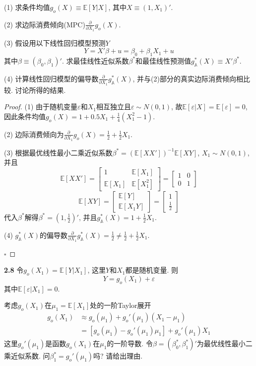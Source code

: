 \documentclass[cn,12pt,math=mtpro2,citestyle=gb7714-2015,bibstyle=gb7714-2015,twocol,mode=simple]{elegantbook}
\newcommand{\E}{\mathbb{E}}
\begin{document}
(1) 求条件均值$g_o(X)\equiv \E[Y|X]$, 其中$X\equiv(1,X_1)'$.

(2) 求边际消费倾向(MPC)$\displaystyle \frac{\partial}{\partial X_1}g_o(X)$.

(3) 假设用以下线性回归模型预测$Y$
$$Y=X'\beta+u=\beta_0+\beta_1X_1+u$$
其中$\beta\equiv (\beta_0,\beta_1)'$. 求最佳线性近似系数$\beta^{\ast}$和最佳线性预测值$g^{\ast}_{\mathbb{A}}(X)\equiv X'\beta^{\ast}$.

(4) 计算线性回归模型的偏导数$\displaystyle \frac{\partial}{\partial X_1}g_{\mathbb{A}}^{\ast}(X)$, 并与(2)部分的真实边际消费倾向相比较. 讨论所得的结果.

\begin{proof}
  (1) 由于随机变量$\varepsilon$和$X_1$相互独立且$\varepsilon \sim N(0,1)$, 故$\E[\varepsilon | X]=\E[\varepsilon]=0$, 因此条件均值$\displaystyle g_o(X)=1+0.5X_1+\frac{1}{4}(X_1^2-1)$.

  (2) 边际消费倾向为$\displaystyle \frac{\partial}{\partial X_1}g_o(X)=\frac{1}{2}+\frac{1}{2}X_1$.

  (3) 根据最优线性最小二乘近似系数$\beta^{\ast}=(\E[XX'])^{-1}\E[XY]$, $X_1 \sim N(0,1)$, 并且
  $$\E[XX']=\begin{bmatrix}
 1 & \E[X_1]\\
 \E[X_1] & \E[X_1^2]
\end{bmatrix}=\begin{bmatrix}
 1 & 0\\
 0 & 1
\end{bmatrix}$$
$$\E[XY]=\begin{bmatrix}
\E[Y] \\
\E[X_1Y]
\end{bmatrix}=\begin{bmatrix}
1 \\
\displaystyle\frac{1}{2}
\end{bmatrix}$$
代入$\beta^{\ast}$解得$\beta^{\ast}=(1,\displaystyle\frac{1}{2})'$, 并且$\displaystyle g_{\mathbb{A}}^{\ast}(X)=1+\frac{1}{2}X_1$.

(4) $g_{\mathbb{A}}^{\ast}(X)$的偏导数$\displaystyle \frac{\partial}{\partial X_1}g_{\mathbb{A}}^{\ast}(X)=\frac{1}{2}\neq\frac{1}{2}+\frac{1}{2}X_1$.

$\square$
\end{proof}

\textbf{2.8} 令$g_o(X_1)=\E[Y|X_1]$, 这里$Y$和$X_1$都是随机变量. 则
$$Y=g_o(X_1)+\varepsilon$$
其中$\E[\varepsilon|X_1]=0$.

考虑$g_o(X_1)$在$\mu_1=\E[X_1]$处的一阶Taylor展开
\begin{align}
g_o(X_1) &\approx g_o(\mu_1)+g_o'(\mu_1)(X_1-\mu_1) \nonumber \\
&=[g_o(\mu_1)-g_o'(\mu_1)\mu_1]+g_o'(\mu_1)X_1 \nonumber
\end{align}
这里$g_o'(\mu_1)$是函数$g_o(X_1)$在$\mu_1$的一阶导数. 令$\beta=(\beta_0^{\ast},\beta_1^{\ast})'$为最优线性最小二乘近似系数. 问$\beta_1^{\ast}=g_o'(\mu_1)$吗? 请给出理由.
\end{document}
